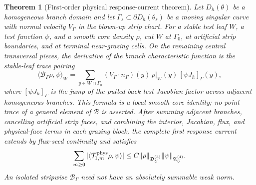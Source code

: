 \documentclass[11pt]{amsart}
\theoremstyle{compactplain}
\newtheorem{theorem}{Theorem}[section]
\theoremstyle{compactdefinition}
\theoremstyle{compactremark}
\newcommand{\Bcal}{\mathcal B}
\begin{document}
\begin{theorem}[First-order physical response-current theorem]
\label{thm:first_order_physical_trace}
Let $D_h(\theta)$ be a homogeneous branch domain and let
$\Gamma_s\subset\partial D_h(\theta_s)$ be a moving singular curve with normal
velocity $V_\Gamma$ in the blown-up strip chart.  For a stable test leaf $W$, a
test function $\psi$, and a smooth core density $\rho$, cut \(W\) at
\(\Gamma_0\), at artificial strip boundaries, and at terminal near-grazing
cells.  On the remaining central transversal pieces, the derivative of the
branch characteristic function is the stable-leaf trace pairing
\begin{equation}
  \big\langle \mathcal B_\Gamma\rho,\psi\big\rangle_W
  =
  \sum_{y\in W\cap\Gamma_0}
  (V_\Gamma\cdot n_\Gamma)(y)\,\rho|_W(y)\,[\psi J_h]_\Gamma(y),
\end{equation}
where $[\psi J_h]_\Gamma$ is the jump of the pulled-back test-Jacobian factor
across adjacent homogeneous branches.  This formula is a local smooth-core
identity; no point trace of a general element of \(\Bcal\) is asserted.
After summing adjacent branches, cancelling artificial strip faces, and
combining the interior, Jacobian, flux, and physical-face terms in each
grazing block, the complete first response current extends by flux-seed
continuity and satisfies
\begin{equation}
  \sum_{m\ge0}
  |\langle\mathcal T_{1,m}^{\rm phys}\rho,\psi\rangle|
  \le
  C\|\rho\|_{\mathfrak D_U^{(3)}}
  \|\psi\|_{\mathfrak A_U^{(4)}} .
\end{equation}
An isolated stripwise \(\mathcal B_\Gamma\) need not have an absolutely
summable weak norm.
\end{theorem}
\end{document}
